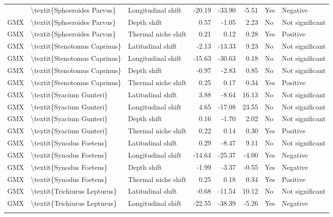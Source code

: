 \begin{longtable}[t]{lllrrrll}
{{GMX & \textbackslash{}textit\{Sphoeroides Parvus\} & Longitudinal shift & -20.19 & -33.90 & -5.51 & Yes & Negative\\
GMX & \textbackslash{}textit\{Sphoeroides Parvus\} & Depth shift & 0.57 & -1.05 & 2.23 & No & Not significant\\
GMX & \textbackslash{}textit\{Sphoeroides Parvus\} & Thermal niche shift & 0.21 & 0.12 & 0.28 & Yes & Positive\\
GMX & \textbackslash{}textit\{Stenotomus Caprinus\} & Latitudinal shift & -2.13 & -13.33 & 9.23 & No & Not significant\\
\addlinespace
GMX & \textbackslash{}textit\{Stenotomus Caprinus\} & Longitudinal shift & -15.63 & -30.63 & 0.18 & No & Not significant\\
GMX & \textbackslash{}textit\{Stenotomus Caprinus\} & Depth shift & -0.97 & -2.83 & 0.85 & No & Not significant\\
GMX & \textbackslash{}textit\{Stenotomus Caprinus\} & Thermal niche shift & 0.25 & 0.17 & 0.34 & Yes & Positive\\
GMX & \textbackslash{}textit\{Syacium Gunteri\} & Latitudinal shift & 3.88 & -8.64 & 16.13 & No & Not significant\\
GMX & \textbackslash{}textit\{Syacium Gunteri\} & Longitudinal shift & 4.65 & -17.08 & 23.55 & No & Not significant\\
\addlinespace
GMX & \textbackslash{}textit\{Syacium Gunteri\} & Depth shift & 0.16 & -1.70 & 2.02 & No & Not significant\\
GMX & \textbackslash{}textit\{Syacium Gunteri\} & Thermal niche shift & 0.22 & 0.14 & 0.30 & Yes & Positive\\
GMX & \textbackslash{}textit\{Synodus Foetens\} & Latitudinal shift & 0.29 & -8.47 & 9.11 & No & Not significant\\
GMX & \textbackslash{}textit\{Synodus Foetens\} & Longitudinal shift & -14.64 & -25.37 & -4.00 & Yes & Negative\\
GMX & \textbackslash{}textit\{Synodus Foetens\} & Depth shift & -1.99 & -3.37 & -0.55 & Yes & Negative\\
\addlinespace
GMX & \textbackslash{}textit\{Synodus Foetens\} & Thermal niche shift & 0.25 & 0.18 & 0.34 & Yes & Positive\\
GMX & \textbackslash{}textit\{Trichiurus Lepturus\} & Latitudinal shift & -0.68 & -11.54 & 10.12 & No & Not significant\\
GMX & \textbackslash{}textit\{Trichiurus Lepturus\} & Longitudinal shift & -22.55 & -38.39 & -5.26 & Yes & Negative\\
}}
\end{longtable}

